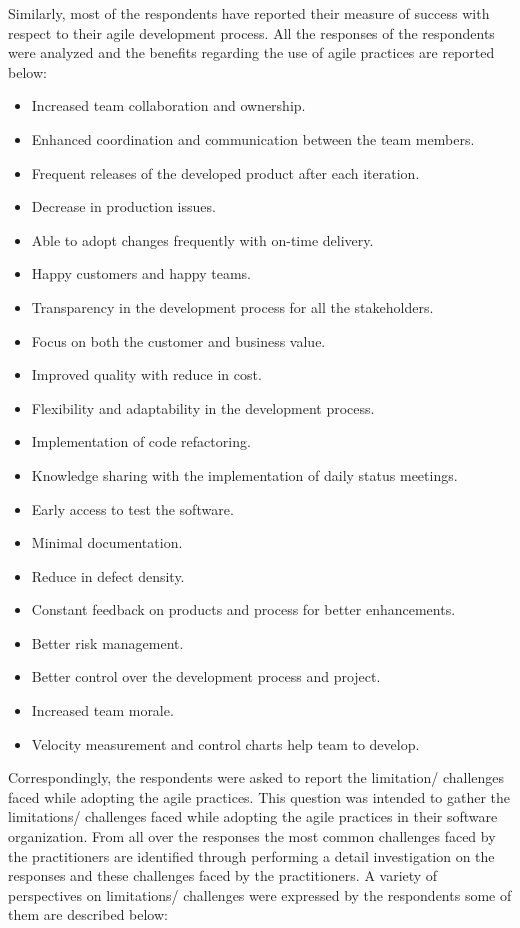 \documentclass[a4paper,oneside]{bth}
\begin{document}
Similarly, most of the respondents have reported their measure of success with respect to their agile development process. All the responses of the respondents were analyzed and the benefits regarding the use of agile practices are reported below:
\begin{itemize}
\item Increased team collaboration and ownership.
\item	Enhanced coordination and communication between the team members.
\item	Frequent releases of the developed product after each iteration.
\item	Decrease in production issues.
\item	Able to adopt changes frequently with on-time delivery.
\item	Happy customers and happy teams.
\item	Transparency in the development process for all the stakeholders.
\item	Focus on both the customer and business value.
\item	Improved quality with reduce in cost.
\item	Flexibility and adaptability in the development process.
\item	Implementation of code refactoring.
\item 	Knowledge sharing with the implementation of daily status meetings.
\item	Early access to test the software.
\item	Minimal documentation.
\item	Reduce in defect density.
\item	Constant feedback on products and process for better enhancements.
\item	Better risk management.
\item	Better control over the development process and project.
\item	Increased team morale.
\item Velocity measurement and control charts help team to develop.

\end{itemize}

Correspondingly, the respondents were asked to report the limitation/ challenges faced while adopting the agile practices. This question was intended to gather the limitations/ challenges faced while adopting the agile practices in their software organization. From all over the responses the most common challenges faced by the practitioners are identified through performing a detail investigation on the responses and these challenges faced by the practitioners. A variety of perspectives on limitations/ challenges were expressed by the respondents some of them are described below:
\end{document}
